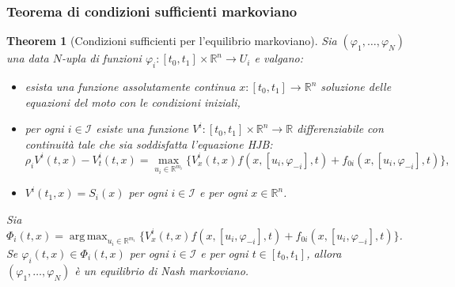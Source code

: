 \documentclass{beamer}
\theoremstyle{plain}
\newtheorem{thm}{Theorem}[section]
\theoremstyle{definition}
\DeclareMathOperator*{\argmax}{arg\,max}
\begin{document}
\begin{frame}
\footnotesize 
\frametitle{Teorema di condizioni sufficienti markoviano}
\begin{thm}[Condizioni sufficienti per l'equilibrio markoviano]
Sia $(\varphi_1,\dots,\varphi_N)$ una data $N$-upla di funzioni $\varphi_i: [t_0, t_1] \times \mathbb{R}^n \to U_i$ e valgano: 
\begin{itemize}
    \item esista una funzione assolutamente continua $x: [t_0, t_1] \to \mathbb{R}^n$ soluzione delle equazioni del moto con le condizioni iniziali,
    \item per ogni $i \in \mathcal{I}$ esiste una funzione $V^i: [t_0, t_1] \times \mathbb{R}^n \to \mathbb{R}$ differenziabile con continuità tale che sia soddisfatta l'equazione \emph{HJB}:
    \scriptsize{
    \[ 
    \rho_i V^i(t, x) - V_t^i(t, x) = 
        \max_{u_i \in \mathbb{R}^{m_i}} \bigg\{V_x^i(t,x) f(x, [u_i, \varphi_{-i}], t) + f_{0i}(x, [u_i, \varphi_{-i}], t) \bigg\},
    \] }
    \item $V^i(t_1, x) = S_i(x)$ per ogni $i \in \mathcal{I}$ e per ogni $x \in \mathbb{R}^n$.
\end{itemize}
Sia $\Phi_i(t,x) = \argmax_{u_i \in \mathbb{R}^{m_i}} \bigg\{V_x^i(t,x) f(x, [u_i, \varphi_{-i}], t) + f_{0i}(x, [u_i, \varphi_{-i}], t) \bigg\}$. \\
    Se $\varphi_i (t,x) \in \Phi_i(t,x)$ per ogni $i \in \mathcal{I}$ e per ogni $t \in [t_0, t_1]$, allora $(\varphi_1,\dots,\varphi_N)$ è un equilibrio di Nash markoviano.
\end{thm}
\end{frame}
\end{document}
